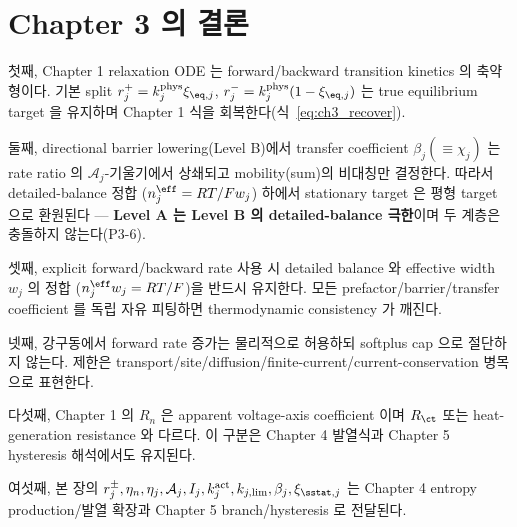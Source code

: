 \section{Chapter 3 의 결론}\label{sec:ch3_concl}
첫째, Chapter 1 relaxation ODE 는 forward/backward transition kinetics 의 축약형이다. 기본 split
$r_j^+=k_j^{\mathrm{phys}}\xi_{\eq,j}$, $r_j^-=k_j^{\mathrm{phys}}(1-\xi_{\eq,j})$ 는 true equilibrium target
을 유지하며 Chapter 1 식을 회복한다(식~\eqref{eq:ch3_recover}).

둘째, directional barrier lowering(Level B)에서 transfer coefficient $\beta_j(\equiv\chi_j)$ 는 rate ratio 의
$\mathcal A_j$-기울기에서 상쇄되고 mobility(sum)의 비대칭만 결정한다. 따라서 detailed-balance 정합
($n_j^{\eff}=RT/Fw_j$) 하에서 stationary target 은 평형 target 으로 환원된다 — \textbf{Level A 는 Level B 의
detailed-balance 극한}이며 두 계층은 충돌하지 않는다(P3-6).

셋째, explicit forward/backward rate 사용 시 detailed balance 와 effective width $w_j$ 의 정합
($n_j^{\eff}w_j=RT/F$)을 반드시 유지한다. 모든 prefactor/barrier/transfer coefficient 를 독립 자유
피팅하면 thermodynamic consistency 가 깨진다.

넷째, 강구동에서 forward rate 증가는 물리적으로 허용하되 softplus cap 으로 절단하지 않는다. 제한은
transport/site/diffusion/finite-current/current-conservation 병목으로 표현한다.

다섯째, Chapter 1 의 $R_n$ 은 apparent voltage-axis coefficient 이며 $R_{\ct}$ 또는 heat-generation
resistance 와 다르다. 이 구분은 Chapter 4 발열식과 Chapter 5 hysteresis 해석에서도 유지된다.

여섯째, 본 장의 $r_j^\pm,\eta_n,\eta_j,\mathcal A_j,I_j,k_j^{\mathrm{act}},k_{j,\lim},\beta_j,\xi_{\sstat,j}$ 는
Chapter 4 entropy production/발열 확장과 Chapter 5 branch/hysteresis 로 전달된다.


